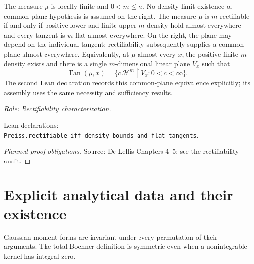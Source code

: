 \begin{theorem}
\label{thm:rectifiable-iff-flat}







The measure \(\mu\) is locally finite and \(0<m\leq n\). No density-limit existence or common-plane hypothesis is assumed on the right.
The measure \(\mu\) is \(m\)-rectifiable if and only if positive lower and finite upper \(m\)-density hold almost everywhere and every tangent is \(m\)-flat almost everywhere. On the right, the plane may depend on the individual tangent; rectifiability subsequently supplies a common plane almost everywhere.
Equivalently, at \(\mu\)-almost every \(x\), the positive finite
\(m\)-density exists and there is a single \(m\)-dimensional linear plane
\(V_x\) such that
\[
 \operatorname{Tan}(\mu,x)=
 \{c\,\mathcal H^m\!\restriction V_x:0<c<\infty\}.
\]
The second Lean declaration records this common-plane equivalence explicitly;
its assembly uses the same necessity and sufficiency results.
\par\emph{Role: Rectifiability characterization.}
\par Lean declarations: \texttt{Preiss.rectifiable\_iff\_density\_bounds\_and\_flat\_tangents}.
\end{theorem}
\begin{proof}[Planned proof obligations]

\par Source: De Lellis Chapters 4--5; see the rectifiability audit.
\end{proof}

\section{Explicit analytical data and their existence}

\begin{lemma}
\label{lem:moment-form-symmetry}
Gaussian moment forms are invariant under every permutation of their arguments. The total Bochner definition is symmetric even when a nonintegrable kernel has integral zero.
\end{lemma}

